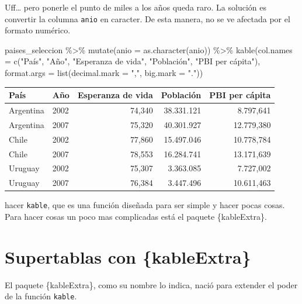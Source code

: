 \documentclass[
  openany]{book}
\newenvironment{Shaded}{\begin{snugshade}}{\end{snugshade}}
\newcommand{\AttributeTok}[1]{\textcolor[rgb]{0.77,0.63,0.00}{#1}}
\newcommand{\FunctionTok}[1]{\textcolor[rgb]{0.00,0.00,0.00}{#1}}
\newcommand{\NormalTok}[1]{#1}
\newcommand{\SpecialCharTok}[1]{\textcolor[rgb]{0.00,0.00,0.00}{#1}}
\newcommand{\StringTok}[1]{\textcolor[rgb]{0.31,0.60,0.02}{#1}}
\begin{document}
Uff\ldots{} pero ponerle el punto de miles a los años queda raro.
La solución es convertir la columna \texttt{anio} en caracter.
De esta manera, no se ve afectada por el formato numérico.

\begin{Shaded}
\begin{Highlighting}[]
\NormalTok{paises\_seleccion }\SpecialCharTok{\%\textgreater{}\%} 
  \FunctionTok{mutate}\NormalTok{(}\AttributeTok{anio =} \FunctionTok{as.character}\NormalTok{(anio)) }\SpecialCharTok{\%\textgreater{}\%} 
  \FunctionTok{kable}\NormalTok{(}\AttributeTok{col.names =} \FunctionTok{c}\NormalTok{(}\StringTok{"País"}\NormalTok{, }\StringTok{"Año"}\NormalTok{, }\StringTok{"Esperanza de vida"}\NormalTok{, }\StringTok{"Población"}\NormalTok{, }\StringTok{"PBI per cápita"}\NormalTok{),}
        \AttributeTok{format.args =} \FunctionTok{list}\NormalTok{(}\AttributeTok{decimal.mark =} \StringTok{","}\NormalTok{, }\AttributeTok{big.mark =} \StringTok{"."}\NormalTok{))}
\end{Highlighting}
\end{Shaded}

\begin{tabular}{l|l|r|r|r}
\hline
País & Año & Esperanza de vida & Población & PBI per cápita\\
\hline
Argentina & 2002 & 74,340 & 38.331.121 & 8.797,641\\
\hline
Argentina & 2007 & 75,320 & 40.301.927 & 12.779,380\\
\hline
Chile & 2002 & 77,860 & 15.497.046 & 10.778,784\\
\hline
Chile & 2007 & 78,553 & 16.284.741 & 13.171,639\\
\hline
Uruguay & 2002 & 75,307 & 3.363.085 & 7.727,002\\
\hline
Uruguay & 2007 & 76,384 & 3.447.496 & 10.611,463\\
\hline
\end{tabular}

hacer \texttt{kable}, que es una función diseñada para ser simple y hacer pocas cosas.
Para hacer cosas un poco mas complicadas está el paquete \{kableExtra\}.

\hypertarget{supertablas-con-kableextra}{%
\section{Supertablas con \{kableExtra\}}\label{supertablas-con-kableextra}}

El paquete \{kableExtra\}, como su nombre lo indica, nació para extender el poder de la función \texttt{kable}.
\end{document}
